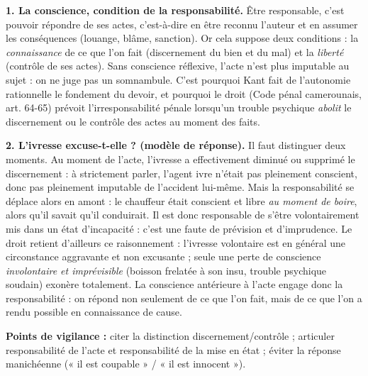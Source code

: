 \documentclass[11pt]{article}
\begin{document}
\begin{corrige}
\textbf{1. La conscience, condition de la responsabilité.} Être responsable, c'est pouvoir répondre de ses actes, c'est-à-dire en être reconnu l'auteur et en assumer les conséquences (louange, blâme, sanction). Or cela suppose deux conditions : la \emph{connaissance} de ce que l'on fait (discernement du bien et du mal) et la \emph{liberté} (contrôle de ses actes). Sans conscience réflexive, l'acte n'est plus imputable au sujet : on ne juge pas un somnambule. C'est pourquoi Kant fait de l'autonomie rationnelle le fondement du devoir, et pourquoi le droit (Code pénal camerounais, art. 64-65) prévoit l'irresponsabilité pénale lorsqu'un trouble psychique \emph{abolit} le discernement ou le contrôle des actes au moment des faits.

\textbf{2. L'ivresse excuse-t-elle ? (modèle de réponse).} Il faut distinguer deux moments. Au moment de l'acte, l'ivresse a effectivement diminué ou supprimé le discernement : à strictement parler, l'agent ivre n'était pas pleinement conscient, donc pas pleinement imputable de l'accident lui-même. Mais la responsabilité se déplace alors en amont : le chauffeur était conscient et libre \emph{au moment de boire}, alors qu'il savait qu'il conduirait. Il est donc responsable de s'être volontairement mis dans un état d'incapacité : c'est une faute de prévision et d'imprudence. Le droit retient d'ailleurs ce raisonnement : l'ivresse volontaire est en général une circonstance aggravante et non excusante ; seule une perte de conscience \emph{involontaire et imprévisible} (boisson frelatée à son insu, trouble psychique soudain) exonère totalement. La conscience antérieure à l'acte engage donc la responsabilité : on répond non seulement de ce que l'on fait, mais de ce que l'on a rendu possible en connaissance de cause.

\textbf{Points de vigilance :} citer la distinction discernement/contrôle ; articuler responsabilité de l'acte et responsabilité de la mise en état ; éviter la réponse manichéenne (« il est coupable » / « il est innocent »).
\end{corrige}
\end{document}
